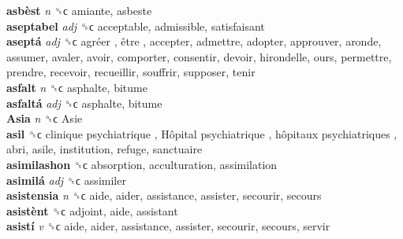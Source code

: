 \textbf{asbèst} \emph{n}  ␝ϲ  amiante, asbeste  \\
\textbf{aseptabel} \emph{adj}  ␝ϲ  acceptable, admissible, satisfaisant  \\
\textbf{aseptá} \emph{adj}  ␝ϲ   agréer ,  être , accepter, admettre, adopter, approuver, aronde, assumer, avaler, avoir, comporter, consentir, devoir, hirondelle, ours, permettre, prendre, recevoir, recueillir, souffrir, supposer, tenir  \\
\textbf{asfalt} \emph{n}  ␝ϲ  asphalte, bitume  \\
\textbf{asfaltá} \emph{adj}  ␝ϲ  asphalte, bitume  \\
\textbf{Asia} \emph{n}  ␝ϲ   Asie   \\
\textbf{asil} ␝ϲ   clinique psychiatrique ,  Hôpital psychiatrique ,  hôpitaux psychiatriques , abri, asile, institution, refuge, sanctuaire  \\
\textbf{asimilashon} ␝ϲ  absorption, acculturation, assimilation  \\
\textbf{asimilá} \emph{adj}  ␝ϲ  assimiler  \\
\textbf{asistensia} \emph{n}  ␝ϲ  aide, aider, assistance, assister, secourir, secours  \\
\textbf{asistènt} ␝ϲ  adjoint, aide, assistant  \\
\textbf{asistí} \emph{v}  ␝ϲ  aide, aider, assistance, assister, secourir, secours, servir  \\
